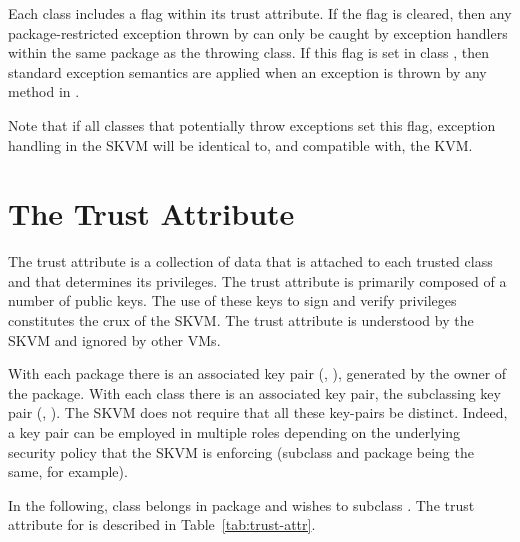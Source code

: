 \documentclass{llncs}
\begin{document}
Each class includes a flag within its trust attribute. If the flag
is cleared, then any package-restricted exception thrown by  can
only be caught by exception handlers within the same package as the
throwing class. If this flag is set in class , then standard
exception semantics are applied when an exception is thrown by any
method in .

Note that if all classes that potentially throw exceptions set this
flag, exception handling in the SKVM will be identical to, and
compatible with, the KVM.

\section{The Trust Attribute}

The trust attribute is a collection of data that is attached to
each trusted class and that determines its privileges. The trust
attribute is primarily composed of a number of public keys.
The use of these keys to sign and verify privileges
constitutes the crux of the SKVM. The trust attribute is understood
by the SKVM and ignored by other VMs.

With each package  there is an associated key pair (, ),
generated by the owner of the package. With each class  there is
an associated key pair, the subclassing key pair (, ). The
SKVM does not require that all these key-pairs be distinct. Indeed,
a key pair can be employed in multiple roles depending on the
underlying security policy that the SKVM is enforcing (subclass and
package being the same, for example).

In the following, class  belongs in package  and wishes to subclass
. The trust attribute for  is described in Table~\ref{tab:trust-attr}.
\end{document}
